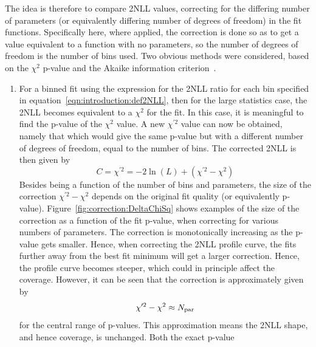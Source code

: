 The idea is therefore to compare 2NLL values,
correcting for the differing number of parameters 
(or equivalently differing number of degrees of freedom) in
the fit functions. Specifically here, where applied, the correction is
done so as to get a value equivalent to a function with no parameters, so
the number of degrees of freedom is the number of bins used.
Two obvious methods were considered, based on the 
$\chi^2$ p-value and the Akaike information 
criterion~\cite{ref:correction:akaike}.
\begin{enumerate}
\item %
For a binned fit using the expression for the 2NLL ratio
for each bin specified in equation~\ref{eqn:introduction:def2NLL}, then for
the large statistics case, the 2NLL becomes equivalent to a $\chi^2$ for the
fit. In this case, it is meaningful to find the p-value of the $\chi^2$ value.
A new $\chi^{\prime 2}$
value can now be obtained, namely that which would give the same p-value but
with a different number of degrees of freedom, equal to the number of bins.
The corrected 2NLL is then given by
\begin{displaymath}
C = \chi^{\prime 2} = - 2\ln(L) + (\chi^{\prime 2} - \chi^2)
\end{displaymath}
Besides being a function of the number of bins and parameters,
the size of the correction $\chi^{\prime 2} - \chi^2$
depends on the original fit quality
(or equivalently p-value). Figure~\ref{fig:correction:DeltaChiSq}
shows examples of the size of the correction as a function of the
fit p-value, when correcting for various numbers of parameters.
The correction is monotonically increasing as the p-value gets smaller.
Hence, when correcting the 2NLL profile curve, the fits further away from
the best fit minimum will get a larger correction. Hence, the profile curve
becomes steeper, which could in principle affect the coverage.
However, it can be seen that the correction is approximately given by
\begin{displaymath}
\chi^{\prime 2} - \chi^2 \approx N_{\rm par}
\end{displaymath}
for the central range of p-values. This approximation means the 
2NLL shape, and hence coverage, is unchanged. Both the exact p-value

\end{enumerate}
